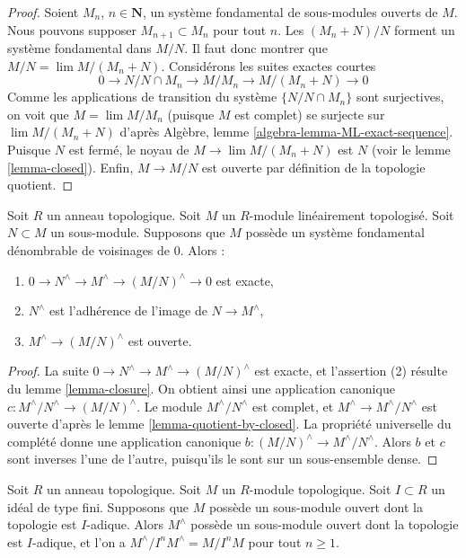 \begin{proof}
Soient $M_n$, $n \in \mathbf{N}$, un système fondamental de sous-modules ouverts de $M$.
Nous pouvons supposer $M_{n + 1} \subset M_n$
pour tout $n$. Les $(M_n + N)/N$ forment un système fondamental dans $M/N$.
Il faut donc montrer que $M/N = \lim M/(M_n + N)$. Considérons
les suites exactes courtes
$$
0 \to N/N \cap M_n \to M/M_n \to M/(M_n + N) \to 0
$$
Comme les applications de transition du système $\{N/N\cap M_n\}$ sont surjectives,
on voit que $M = \lim M/M_n$ (puisque $M$ est complet) se surjecte sur
$\lim M/(M_n + N)$ d'après
Algèbre, lemme \ref{algebra-lemma-ML-exact-sequence}.
Puisque $N$ est fermé, le noyau de $M \to \lim M/(M_n + N)$
est $N$ (voir le lemme \ref{lemma-closed}). Enfin, $M \to M/N$
est ouverte par définition de la topologie quotient.
\end{proof}

\begin{lemma}
\label{lemma-ses}
\begin{reference}
\cite[Theorem 8.1]{Ma}
\end{reference}
Soit $R$ un anneau topologique. Soit $M$ un $R$-module linéairement
topologisé. Soit $N \subset M$ un sous-module. Supposons que $M$ possède un
système fondamental dénombrable de voisinages de $0$. Alors :
\begin{enumerate}
\item $0 \to N^\wedge \to M^\wedge \to (M/N)^\wedge \to 0$ est exacte,
\item $N^\wedge$ est l'adhérence de l'image de $N \to M^\wedge$,
\item $M^\wedge \to (M/N)^\wedge$ est ouverte.
\end{enumerate}
\end{lemma}

\begin{proof}
La suite $0 \to N^\wedge \to M^\wedge \to (M/N)^\wedge$ est exacte,
et l'assertion (2) résulte du lemme \ref{lemma-closure}.
On obtient ainsi une application canonique $c : M^\wedge/N^\wedge \to (M/N)^\wedge$.
Le module $M^\wedge/N^\wedge$ est complet, et
$M^\wedge \to M^\wedge/N^\wedge$ est ouverte d'après
le lemme \ref{lemma-quotient-by-closed}.
La propriété universelle du complété donne une application canonique
$b : (M/N)^\wedge \to M^\wedge/N^\wedge$.
Alors $b$ et $c$ sont inverses l'une de l'autre, puisqu'ils le sont sur un sous-ensemble dense.
\end{proof}

\begin{lemma}
\label{lemma-completion-adic-star}
Soit $R$ un anneau topologique. Soit $M$ un $R$-module topologique.
Soit $I \subset R$ un idéal de type fini. Supposons que $M$
possède un sous-module ouvert dont la topologie est $I$-adique. Alors $M^\wedge$
possède un sous-module ouvert dont la topologie est $I$-adique, et l'on a
$M^\wedge/I^n M^\wedge = M/I^nM$ pour tout $n \geq 1$.
\end{lemma}

